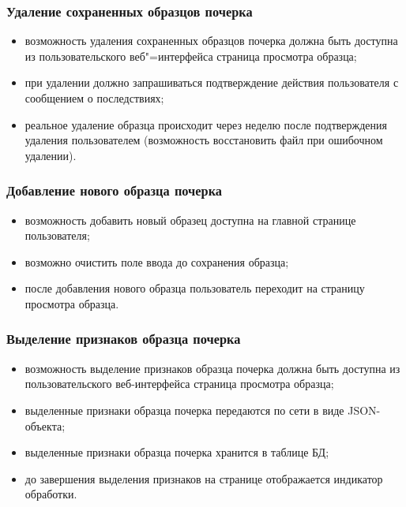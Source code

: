 \subsubsection{Удаление сохраненных образцов почерка}
\label{sec:freq:delete}
\begin{itemize}
	\item возможность удаления сохраненных образцов почерка должна быть доступна из пользовательского веб"=интерфейса страница просмотра образца;
	\item при удалении должно запрашиваться подтверждение действия пользователя с сообщением о последствиях;
	\item реальное удаление образца происходит через неделю после подтверждения удаления пользователем (возможность восстановить файл при ошибочном удалении).
\end{itemize}

\subsubsection{Добавление нового образца почерка}
\label{sec:freq:add}
\begin{itemize}
	\item возможность добавить новый образец доступна на главной странице пользователя;
	\item возможно очистить поле ввода до сохранения образца;
	\item после добавления нового образца пользователь переходит на страницу просмотра образца.
\end{itemize}

\subsubsection{Выделение признаков образца почерка}
\label{sec:freq:extract_features}
\begin{itemize}
	\item возможность выделение признаков образца почерка должна быть доступна из пользовательского веб-интерфейса страница просмотра образца;
	\item выделенные признаки образца почерка передаются по сети в виде JSON-объекта;
	\item выделенные признаки образца почерка хранится в таблице БД;
	\item до завершения выделения признаков на странице отображается индикатор обработки.
\end{itemize}

